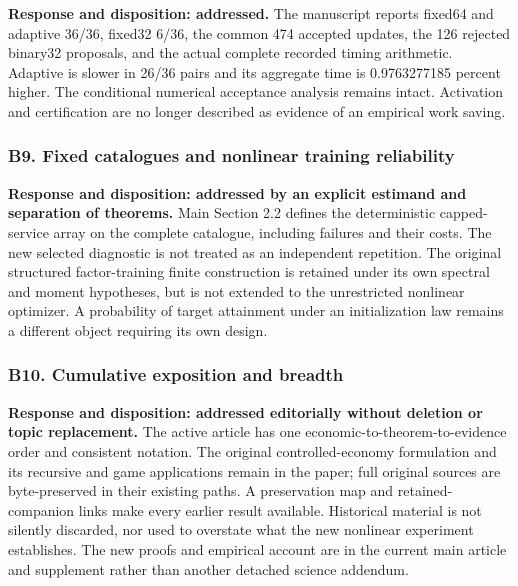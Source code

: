 \documentclass[ecta,nameyear,draft]{econsocart}
\begin{document}
\textbf{Response and disposition: addressed.} The manuscript reports
fixed64 and adaptive 36/36, fixed32 6/36, the common 474 accepted
updates, the 126 rejected binary32 proposals, and the actual complete
recorded timing arithmetic. Adaptive is slower in 26/36 pairs and its
aggregate time is 0.9763277185 percent higher. The conditional numerical
acceptance analysis remains intact. Activation and certification are no
longer described as evidence of an empirical work saving.

\hypertarget{b9-fixed-catalogues-and-nonlinear-training-reliability}{%
\subsubsection{B9. Fixed catalogues and nonlinear training
reliability}\label{b9-fixed-catalogues-and-nonlinear-training-reliability}}

\textbf{Response and disposition: addressed by an explicit estimand and
separation of theorems.} Main Section 2.2 defines the deterministic
capped-service array on the complete catalogue, including failures and
their costs. The new selected diagnostic is not treated as an
independent repetition. The original structured factor-training finite
construction is retained under its own spectral and moment hypotheses,
but is not extended to the unrestricted nonlinear optimizer. A
probability of target attainment under an initialization law remains a
different object requiring its own design.

\hypertarget{b10-cumulative-exposition-and-breadth}{%
\subsubsection{B10. Cumulative exposition and
breadth}\label{b10-cumulative-exposition-and-breadth}}

\textbf{Response and disposition: addressed editorially without deletion
or topic replacement.} The active article has one
economic-to-theorem-to-evidence order and consistent notation. The
original controlled-economy formulation and its recursive and game
applications remain in the paper; full original sources are
byte-preserved in their existing paths. A preservation map and
retained-companion links make every earlier result available. Historical
material is not silently discarded, nor used to overstate what the new
nonlinear experiment establishes. The new proofs and empirical account
are in the current main article and supplement rather than another
detached science addendum.
\end{document}
